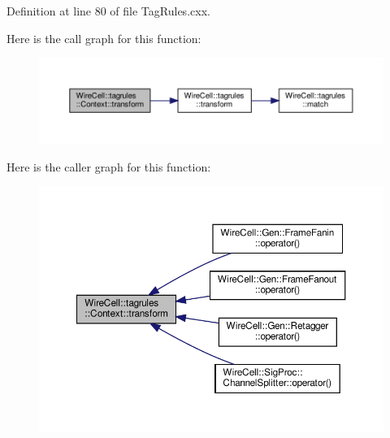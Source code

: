 Definition at line 80 of file Tag\+Rules.\+cxx.

Here is the call graph for this function\+:
\nopagebreak
\begin{figure}[H]
\begin{center}
\leavevmode
\includegraphics[width=350pt]{class_wire_cell_1_1tagrules_1_1_context_aad708e6ea6a1bf0b9e050559fea62ae1_cgraph}
\end{center}
\end{figure}
Here is the caller graph for this function\+:
\nopagebreak
\begin{figure}[H]
\begin{center}
\leavevmode
\includegraphics[width=350pt]{class_wire_cell_1_1tagrules_1_1_context_aad708e6ea6a1bf0b9e050559fea62ae1_icgraph}
\end{center}
\end{figure}
\mbox{\label{class_wire_cell_1_1tagrules_1_1_context_aeade5e7b1f30a07bb1194320575e0ec0}} 
